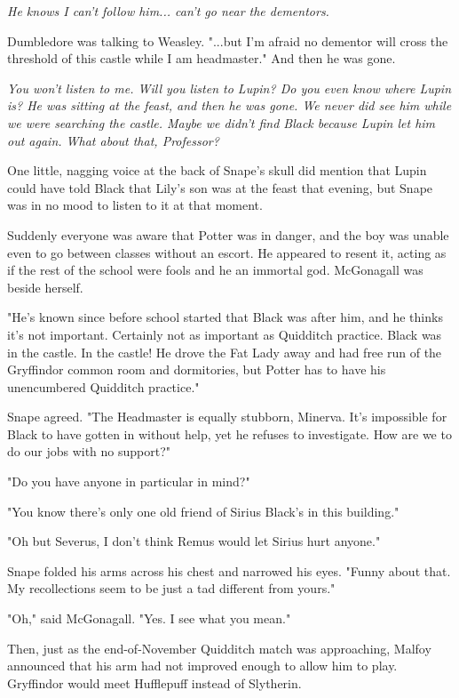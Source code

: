 \documentclass[a4paper,11pt]{article}
\begin{document}
\emph{He knows I can't follow him... can't go near the dementors.}

Dumbledore was talking to Weasley. "...but I'm afraid no dementor will cross the threshold of this castle while I am headmaster." And then he was gone.

\emph{You won't listen to me. Will you listen to Lupin? Do you even know where Lupin is? He was sitting at the feast, and then he was gone. We never did see him while we were searching the castle. Maybe we didn't find Black because Lupin let him out again. What about that, Professor?}

One little, nagging voice at the back of Snape's skull did mention that Lupin could have told Black that Lily's son was at the feast that evening, but Snape was in no mood to listen to it at that moment.

Suddenly everyone was aware that Potter was in danger, and the boy was unable even to go between classes without an escort. He appeared to resent it, acting as if the rest of the school were fools and he an immortal god. McGonagall was beside herself.

"He's known since before school started that Black was after him, and he thinks it's not important. Certainly not as important as Quidditch practice. Black was in the castle. In the castle! He drove the Fat Lady away and had free run of the Gryffindor common room and dormitories, but Potter has to have his unencumbered Quidditch practice."

Snape agreed. "The Headmaster is equally stubborn, Minerva. It's impossible for Black to have gotten in without help, yet he refuses to investigate. How are we to do our jobs with no support?"

"Do you have anyone in particular in mind?"

"You know there's only one old friend of Sirius Black's in this building."

"Oh but Severus, I don't think Remus would let Sirius hurt anyone."

Snape folded his arms across his chest and narrowed his eyes. "Funny about that. My recollections seem to be just a tad different from yours."

"Oh," said McGonagall. "Yes. I see what you mean."

Then, just as the end-of-November Quidditch match was approaching, Malfoy announced that his arm had not improved enough to allow him to play. Gryffindor would meet Hufflepuff instead of Slytherin.
\end{document}
